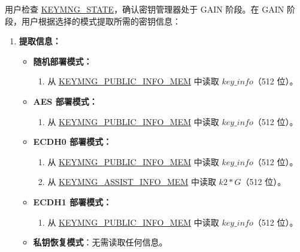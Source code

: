 \documentclass[main\_\_CN.tex]{subfiles}
\begin{document}
用户检查 \hyperref[fielddesc:KEYMNGSTATE]{KEYMNG\_STATE}，确认密钥管理器处于 GAIN 阶段。在 GAIN 阶段，用户根据选择的模式提取所需的密钥信息：
\begin{enumerate}
    \item \textbf{提取信息：}
    \begin{itemize}
        \item \textbf{随机部署模式：}
        \begin{enumerate}
            \item 从 \hyperref[mem:keymng-public-info]{KEYMNG\_PUBLIC\_INFO\_MEM} 中读取 \hyperref[para:keyinfo]{\begin{math}key\_info\end{math}}（512 位）。
        \end{enumerate}
        \item \textbf{AES 部署模式：}
        \begin{enumerate}
            \item 从 \hyperref[mem:keymng-public-info]{KEYMNG\_PUBLIC\_INFO\_MEM} 中读取 \hyperref[para:keyinfo]{\begin{math}key\_info\end{math}}（512 位）。
        \end{enumerate}
        \item \textbf{ECDH0 部署模式：}
        \begin{enumerate}
            \item 从 \hyperref[mem:keymng-public-info]{KEYMNG\_PUBLIC\_INFO\_MEM} 中读取 \hyperref[para:keyinfo]{\begin{math}key\_info\end{math}}（512 位）。
            \item 从 \hyperref[mem:keymng-assist-info]{KEYMNG\_ASSIST\_INFO\_MEM} 中读取 \hyperref[para:k2G]{\begin{math}k2*G\end{math}}（512 位）。
        \end{enumerate}
        \item \textbf{ECDH1 部署模式：}
        \begin{enumerate}
            \item 从 \hyperref[mem:keymng-public-info]{KEYMNG\_PUBLIC\_INFO\_MEM} 中读取 \hyperref[para:keyinfo]{\begin{math}key\_info\end{math}}（512 位）。
        \end{enumerate}
        \item \textbf{私钥恢复模式}：无需读取任何信息。

\end{itemize}
\end{enumerate}
\end{document}

